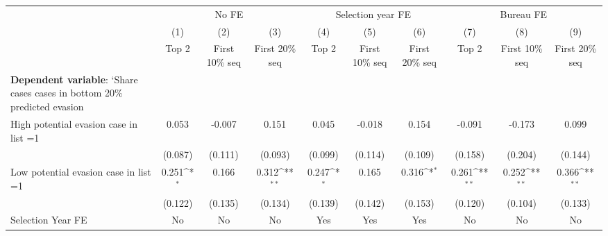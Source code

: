 {
\def\sym#1{\ifmmode^{#1}\else\(^{#1}\)\fi}
\begin{tabular}{l*{9}{c}}
\toprule
            &\multicolumn{3}{c}{No FE}                                        &\multicolumn{3}{c}{Selection year FE}                            &\multicolumn{3}{c}{Bureau FE}                                    \\\cmidrule(lr){2-4}\cmidrule(lr){5-7}\cmidrule(lr){8-10}
            &\multicolumn{1}{c}{(1)}&\multicolumn{1}{c}{(2)}&\multicolumn{1}{c}{(3)}&\multicolumn{1}{c}{(4)}&\multicolumn{1}{c}{(5)}&\multicolumn{1}{c}{(6)}&\multicolumn{1}{c}{(7)}&\multicolumn{1}{c}{(8)}&\multicolumn{1}{c}{(9)}\\
            &\multicolumn{1}{c}{Top 2}&\multicolumn{1}{c}{First 10\% seq}&\multicolumn{1}{c}{First 20\% seq}&\multicolumn{1}{c}{Top 2}&\multicolumn{1}{c}{First 10\% seq}&\multicolumn{1}{c}{First 20\% seq}&\multicolumn{1}{c}{Top 2}&\multicolumn{1}{c}{First 10\% seq}&\multicolumn{1}{c}{First 20\% seq}\\
\midrule
\textbf{Dependent variable}: `Share cases cases in bottom 20\% predicted evasion&                     &                     &                     &                     &                     &                     &                     &                     &                     \\
\addlinespace
High potential evasion case in list =1&       0.053         &      -0.007         &       0.151         &       0.045         &      -0.018         &       0.154         &      -0.091         &      -0.173         &       0.099         \\
            &     (0.087)         &     (0.111)         &     (0.093)         &     (0.099)         &     (0.114)         &     (0.109)         &     (0.158)         &     (0.204)         &     (0.144)         \\
\addlinespace
Low potential evasion case in list =1&       0.251\sym{*}  &       0.166         &       0.312\sym{**} &       0.247\sym{*}  &       0.165         &       0.316\sym{*}  &       0.261\sym{**} &       0.252\sym{**} &       0.366\sym{**} \\
            &     (0.122)         &     (0.135)         &     (0.134)         &     (0.139)         &     (0.142)         &     (0.153)         &     (0.120)         &     (0.104)         &     (0.133)         \\
\midrule
Selection Year FE&          No         &          No         &          No         &         Yes         &         Yes         &         Yes         &          No         &          No         &          No         \\

\end{tabular}}
